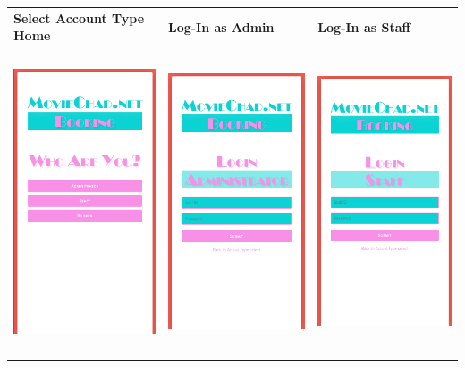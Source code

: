 \documentclass[11pt, english]{article}
\begin{document}
	\begin{center}
        	\scriptsize
        \begin{longtable}{p{5cm}p{5cm}p{5cm}}
                \textbf{Select Account Type Home} & \textbf{Log-In as Admin} & \textbf{Log-In as Staff}\\
		\includegraphics[width=5cm,height=9cm]{CS993_IMG/login1.png} & \includegraphics[width=5cm,height=9cm]{CS993_IMG/login2.png} & \includegraphics[width=5cm,height=9cm]{CS993_IMG/login7.png}\\

\end{longtable}
\end{center}
\end{document}
